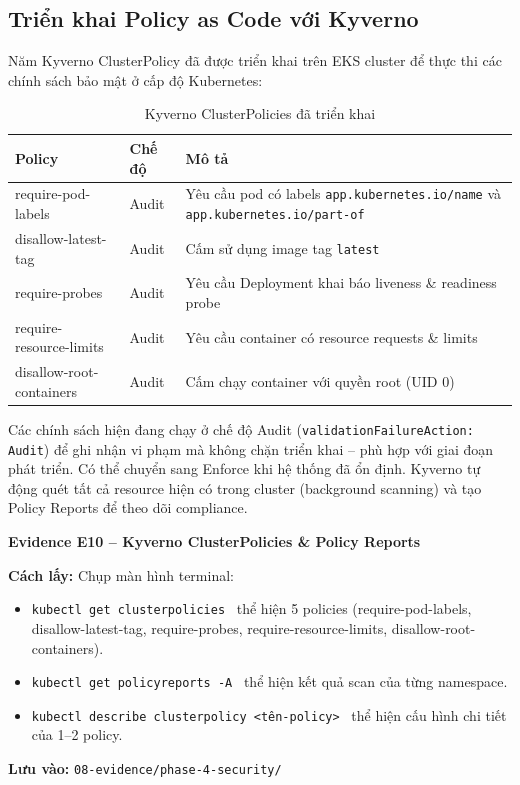 \documentclass[13pt,a4paper,twoside]{extarticle}
\newcommand{\evidence}[1]{%
  \begin{evidencebox}
  #1
  \end{evidencebox}
}
\begin{document}
\subsection{Triển khai Policy as Code với Kyverno}

Năm Kyverno ClusterPolicy đã được triển khai trên EKS cluster để thực thi các chính sách bảo mật ở cấp độ Kubernetes:

\begin{table}[H]
\centering
\begin{tabular}{@{}p{5cm} p{2.5cm} p{6.5cm}@{}}
\toprule
\textbf{Policy} & \textbf{Chế độ} & \textbf{Mô tả} \\
\midrule
require-pod-labels & Audit & Yêu cầu pod có labels \texttt{app.kubernetes.io/name} và \texttt{app.kubernetes.io/part-of} \\
disallow-latest-tag & Audit & Cấm sử dụng image tag \texttt{latest} \\
require-probes & Audit & Yêu cầu Deployment khai báo liveness \& readiness probe \\
require-resource-limits & Audit & Yêu cầu container có resource requests \& limits \\
disallow-root-containers & Audit & Cấm chạy container với quyền root (UID 0) \\
\bottomrule
\end{tabular}
\caption{Kyverno ClusterPolicies đã triển khai}
\label{tab:kyverno-policies}
\end{table}

Các chính sách hiện đang chạy ở chế độ Audit (\texttt{validationFailureAction: Audit}) để ghi nhận vi phạm mà không chặn triển khai -- phù hợp với giai đoạn phát triển. Có thể chuyển sang Enforce khi hệ thống đã ổn định. Kyverno tự động quét tất cả resource hiện có trong cluster (background scanning) và tạo Policy Reports để theo dõi compliance.

\evidence{
\textbf{Evidence E10 -- Kyverno ClusterPolicies \& Policy Reports}

\smallskip
\textbf{Cách lấy:} Chụp màn hình terminal:
\begin{itemize}[leftmargin=*,nosep]
  \item \texttt{kubectl get clusterpolicies} \textrightarrow\ thể hiện 5 policies (require-pod-labels, disallow-latest-tag, require-probes, require-resource-limits, disallow-root-containers).
  \item \texttt{kubectl get policyreports -A} \textrightarrow\ thể hiện kết quả scan của từng namespace.
  \item \texttt{kubectl describe clusterpolicy <tên-policy>} \textrightarrow\ thể hiện cấu hình chi tiết của 1--2 policy.
\end{itemize}
\textbf{Lưu vào:} \texttt{08-evidence/phase-4-security/}
}
\end{document}
